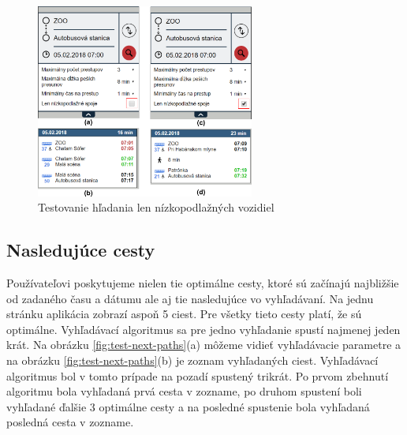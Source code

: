 \begin{figure}[H]
\centerline{\includegraphics[width=0.64\textwidth]{images/test/low-floor}}
\caption[Testovanie hľadania len nízkopodlažných vozidiel]{Testovanie hľadania len nízkopodlažných vozidiel}
\label{fig:test-low-floor}
\end{figure}

\subsection{Nasledujúce cesty}
Používateľovi poskytujeme nielen tie optimálne cesty, ktoré sú začínajú najbližšie od zadaného času a dátumu ale aj tie nasledujúce vo vyhľadávaní. Na jednu stránku aplikácia zobrazí aspoň 5 ciest. Pre všetky tieto cesty platí, že sú optimálne. Vyhľadávací algoritmus sa pre jedno vyhľadanie spustí najmenej jeden krát. Na obrázku \ref{fig:test-next-paths}(a) môžeme vidieť vyhľadávacie parametre a na obrázku \ref{fig:test-next-paths}(b) je zoznam vyhľadaných ciest. Vyhľadávací algoritmus bol v tomto prípade na pozadí spustený trikrát. Po prvom zbehnutí algoritmu bola vyhľadaná prvá cesta v zozname, po druhom spustení boli vyhľadané ďalšie 3 optimálne cesty a na posledné spustenie bola vyhľadaná posledná cesta v zozname.

